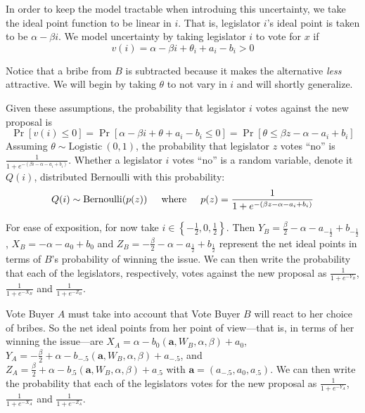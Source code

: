 \documentclass[12pt]{article}
\newcommand{\ve}{\theta}
\newcommand{\al}{\alpha}
\begin{document}
In order to keep the model tractable when introduing this uncertainty, we take the ideal point function to be linear in $i$. That is, legislator $i$'s ideal point is taken to be $\alpha -\beta i$. We model uncertainty by taking legislator $i$ to vote for $x$ if 
			  \[
				  v(i) = \alpha -\beta i + \ve_i + a_i - b_i > 0
				\]
		
Notice that a bribe from $B$ is subtracted because it makes the alternative \textit{less} attractive.	We will begin by taking $\ve$ to not vary in $i$ and will shortly generalize.

Given these assumptions, the probability that legislator $i$ votes against the new proposal is
	\[
					\Pr\left[v(i)\leq 0 \right] = \Pr\left[\alpha -\beta i + \ve + a_i - b_i \leq 0 \right] = \Pr\left[\ve \leq \beta z - \alpha - a_i + b_i \right] 
	\]
Assuming $\ve \sim \text{Logistic} \ (0,1)$, the probability that legislator $z$ votes ``no'' is $\frac{1}{1+e^{-\left(\beta i - \alpha - a_i + b_i \right)}}$.	Whether a legislator $i$ votes ``no'' is a random variable, denote it $Q(i)$, distributed Bernoulli with this probability:
	\[
		Q(i) \sim \text{Bernoulli}(p(z)) \hskip.2in \text{where} \hskip.2in p(z) = \frac{1}{1+e^{-\left(\beta z - \alpha -a_i+ b_i \right)}}
	\]

For ease of exposition, for now take $i \in \left\{ -\frac{1}{2}, 0, \frac{1}{2} \right\}$. Then $Y_B = \frac{\beta}{2} - \alpha - a_{-\frac{1}{2}} + b_{-\frac{1}{2}}$, $X_B = -\alpha - a_0+ b_0$ and $Z_B = -\frac{\beta}{2} - \alpha - a_{\frac{1}{2}} + b_{\frac{1}{2}}\label{page:sh}$ represent the net ideal points in terms of $B$'s probability of winning the issue. We can then write the probability that each of the legislators, respectively, votes against the new proposal as $\frac{1}{1+e^{-Y_B}}$, $\frac{1}{1+e^{-X_B}}$ and $\frac{1}{1+e^{-Z_B}}$.

Vote Buyer $A$ must take into account that Vote Buyer $B$ will react to her choice of bribes. So the net ideal points from her point of view---that is, in terms of her winning the issue---are $X_A = \alpha - b_0(\bm{a},W_B,\al,\beta) + a_0$, $Y_A = -\frac{\beta}{2} + \alpha - b_{-.5}\left(\bm{a},W_B,\al,\beta\right)+ a_{-.5}$, and $Z_A = \frac{\beta}{2} + \alpha - b_{.5}\left(\bm{a},W_B,\al,\beta\right)+ a_{.5}$ with $\bm a = \left(a_{-.5},a_0,a_{.5} \right)$. We can then write the probability that each of the legislators votes for the new proposal as $\frac{1}{1+e^{-Y_A}}$, $\frac{1}{1+e^{-X_A}}$ and $\frac{1}{1+e^{-Z_A}}$.
				
\end{document}
